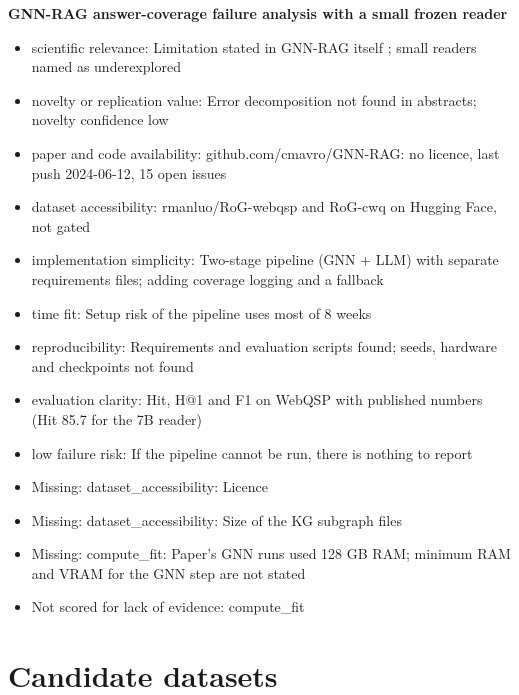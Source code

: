 \documentclass[11pt,a4paper]{article}
\begin{document}
\textbf{GNN-RAG answer-coverage failure analysis with a small frozen reader}
\begin{itemize}
\item scientific relevance: Limitation stated in GNN-RAG itself \cite{mavromatis2024gnnrag}; small readers named as underexplored \cite{um2026rporag}
\item novelty or replication value: Error decomposition not found in abstracts; novelty confidence low
\item paper and code availability: github.com/cmavro/GNN-RAG: no licence, last push 2024-06-12, 15 open issues
\item dataset accessibility: rmanluo/RoG-webqsp and RoG-cwq on Hugging Face, not gated
\item implementation simplicity: Two-stage pipeline (GNN + LLM) with separate requirements files; adding coverage logging and a fallback
\item time fit: Setup risk of the pipeline uses most of 8 weeks
\item reproducibility: Requirements and evaluation scripts found; seeds, hardware and checkpoints not found
\item evaluation clarity: Hit, H@1 and F1 on WebQSP with published numbers (Hit 85.7 for the 7B reader)
\item low failure risk: If the pipeline cannot be run, there is nothing to report
\item Missing: dataset\_accessibility: Licence
\item Missing: dataset\_accessibility: Size of the KG subgraph files
\item Missing: compute\_fit: Paper's GNN runs used 128 GB RAM; minimum RAM and VRAM for the GNN step are not stated
\item Not scored for lack of evidence: compute\_fit
\end{itemize}

\section{Candidate datasets}
\end{document}
